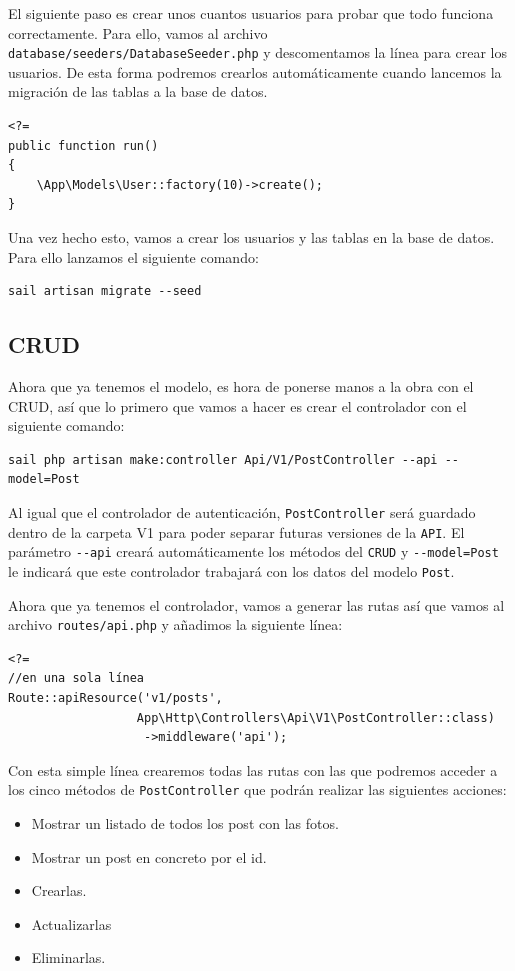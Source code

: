 \documentclass[11pt]{article}
\begin{document}
El siguiente paso es crear unos cuantos usuarios para probar que todo
funciona correctamente. Para ello, vamos al archivo
\texttt{database/seeders/DatabaseSeeder.php} y descomentamos la línea para
crear los usuarios. De esta forma podremos crearlos automáticamente
cuando lancemos la migración de las tablas a la base de datos.
\begin{verbatim}
<?=
public function run()
{
    \App\Models\User::factory(10)->create();
}
\end{verbatim}

Una vez hecho esto, vamos a crear los usuarios y las tablas en la base
de datos. Para ello lanzamos el siguiente comando:
\begin{verbatim}
sail artisan migrate --seed
\end{verbatim}

\subsection{CRUD}
\label{sec:orgf71ec5e}
Ahora que ya tenemos el modelo, es hora de ponerse manos a la obra con
el CRUD, así que lo primero que vamos a hacer es crear el controlador
con el siguiente comando:
\begin{verbatim}
sail php artisan make:controller Api/V1/PostController --api --model=Post
\end{verbatim}

Al igual que el controlador de autenticación, \texttt{PostController} será
guardado dentro de la carpeta V1 para poder separar futuras versiones
de la \texttt{API}. El parámetro \texttt{-{}-api} creará automáticamente los métodos del
\texttt{CRUD} y \texttt{-{}-model=Post} le indicará que este controlador trabajará con los
datos del modelo \texttt{Post}.

Ahora que ya tenemos el controlador, vamos a generar las rutas así que
vamos al archivo \texttt{routes/api.php} y añadimos la siguiente línea:

\begin{verbatim}
<?=
//en una sola línea
Route::apiResource('v1/posts',
                  App\Http\Controllers\Api\V1\PostController::class)
                   ->middleware('api');
\end{verbatim}

Con esta simple línea crearemos todas las rutas con las que podremos
acceder a los cinco métodos de \texttt{PostController} que podrán realizar las
siguientes acciones:

\begin{itemize}
\item Mostrar un listado de todos los post con las fotos.
\item Mostrar un post en concreto por el id.
\item Crearlas.
\item Actualizarlas
\item Eliminarlas.
\end{itemize}
\end{document}
